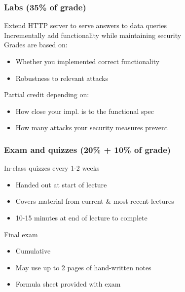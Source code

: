 \documentclass[10pt]{beamer}
\begin{document}

\begin{frame}

\frametitle{Labs (35\% of grade)}

Extend HTTP server to serve answers to data queries
\\[1em]

Incrementally add functionality while maintaining security
\\[1em]

Grades are based on:
\begin{itemize}
\item Whether you implemented correct functionality
\item Robustness to relevant attacks\\[1em]
\end{itemize}

Partial credit depending on:
\begin{itemize}
  \item How close your impl. is to the functional spec
  \item How many attacks your security measures prevent
\end{itemize}

\end{frame}


\begin{frame}

\frametitle{Exam and quizzes (20\% + 10\% of grade)}

In-class quizzes every 1-2 weeks
\begin{itemize}
\item Handed out at start of lecture
\item Covers material from current \& most recent lectures
\item 10-15 minutes at end of lecture to complete\\[1em]
\end{itemize}

Final exam
\begin{itemize}
\item Cumulative
\item May use up to 2 pages of hand-written notes
\item Formula sheet provided with exam
\end{itemize}

\end{frame}
\end{document}
